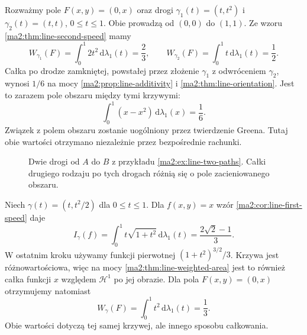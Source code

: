 \begin{przyklad}
\label{ma2:ex:line-two-paths}
Rozważmy pole $F(x,y)=(0,x)$ oraz drogi
$\gamma_1(t)=(t,t^2)$ i $\gamma_2(t)=(t,t)$,
$0\le t\le1$. Obie prowadzą od $(0,0)$ do $(1,1)$.
Ze wzoru \ref{ma2:thm:line-second-speed} mamy
\[
 W_{\gamma_1}(F)=\int_0^1 2t^2\,\mathrm d\lambda_1(t)
 =\frac23,\qquad
 W_{\gamma_2}(F)=\int_0^1 t\,\mathrm d\lambda_1(t)
 =\frac12.
\]
Całka po drodze zamkniętej, powstałej przez
złożenie $\gamma_1$ z odwróceniem $\gamma_2$,
wynosi $1/6$ na mocy
\ref{ma2:prop:line-additivity} i
\ref{ma2:thm:line-orientation}.
Jest to zarazem pole obszaru między tymi krzywymi:
\[
 \int_0^1(x-x^2)\,\mathrm d\lambda_1(x)=\frac16.
\]
Związek z polem obszaru zostanie uogólniony
przez twierdzenie Greena. Tutaj obie wartości
otrzymano niezależnie przez bezpośrednie rachunki.
\end{przyklad}

\begin{figure}[htbp]
\centering
{}
\caption{Dwie drogi od $A$ do $B$ z przykładu
\ref{ma2:ex:line-two-paths}. Całki drugiego rodzaju
po tych drogach różnią się o pole zacieniowanego obszaru.}
\label{ma2:fig:line-two-paths}
\end{figure}

\begin{przyklad}
\label{ma2:ex:line-graph}
Niech $\gamma(t)=(t,t^2/2)$ dla $0\le t\le1$.
Dla $f(x,y)=x$ wzór \ref{ma2:cor:line-first-speed}
daje
\[
 I_\gamma(f)=\int_0^1t\sqrt{1+t^2}\,
 \mathrm d\lambda_1(t)
 =\frac{2\sqrt2-1}{3}.
\]
W ostatnim kroku używamy funkcji pierwotnej
$(1+t^2)^{3/2}/3$.
Krzywa jest różnowartościowa, więc na mocy
\ref{ma2:thm:line-weighted-area} jest to również
całka funkcji $x$ względem $\mathcal H^1$
po jej obrazie. Dla pola $F(x,y)=(0,x)$
otrzymujemy natomiast
\[
 W_\gamma(F)=\int_0^1t^2\,\mathrm d\lambda_1(t)
 =\frac13.
\]
Obie wartości dotyczą tej samej krzywej,
ale innego sposobu całkowania.
\end{przyklad}

